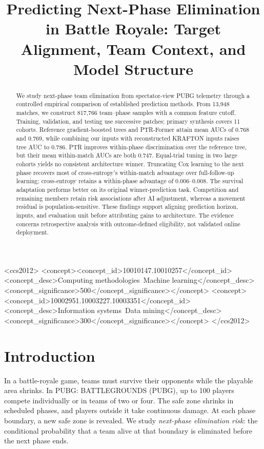 \documentclass[sigconf,anonymous,nonacm]{acmart}
\begin{document}
\title[Next-Phase Elimination Risk in Battle Royale]{Predicting Next-Phase Elimination in Battle Royale: Target Alignment, Team Context, and Model Structure}
\begin{abstract}
We study next-phase team elimination from spectator-view PUBG telemetry through a controlled empirical comparison of established prediction methods. From 13,948 matches, we construct 817,766 team--phase samples with a common feature cutoff. Training, validation, and testing use successive patches; primary synthesis covers 11 cohorts. Reference gradient-boosted trees and PTR-Former attain mean AUCs of 0.768 and 0.769, while combining our inputs with reconstructed KRAFTON inputs raises tree AUC to 0.786. PTR improves within-phase discrimination over the reference tree, but their mean within-match AUCs are both 0.747. Equal-trial tuning in two large cohorts yields no consistent architecture winner. Truncating Cox learning to the next phase recovers most of cross-entropy's within-match advantage over full-follow-up learning; cross-entropy retains a within-phase advantage of 0.006--0.008. The survival adaptation performs better on its original winner-prediction task. Competition and remaining members retain risk associations after AI adjustment, whereas a movement residual is population-sensitive. These findings support aligning prediction horizon, inputs, and evaluation unit before attributing gains to architecture. The evidence concerns retrospective analysis with outcome-defined eligibility, not validated online deployment.
\end{abstract}
\begin{CCSXML}
<ccs2012>
<concept><concept_id>10010147.10010257</concept_id><concept_desc>Computing methodologies~Machine learning</concept_desc><concept_significance>500</concept_significance></concept>
<concept><concept_id>10002951.10003227.10003351</concept_id><concept_desc>Information systems~Data mining</concept_desc><concept_significance>300</concept_significance></concept>
</ccs2012>
\end{CCSXML}
\maketitle
\section{Introduction}
\label{sec:introduction}
In a battle-royale game, teams must survive their opponents while the playable area shrinks. In PUBG: BATTLEGROUNDS (PUBG), up to 100 players compete individually or in teams of two or four. The safe zone shrinks in scheduled phases, and players outside it take continuous damage. At each phase boundary, a new safe zone is revealed. We study \emph{next-phase elimination risk}: the conditional probability that a team alive at that boundary is eliminated before the next phase ends.
\end{document}
